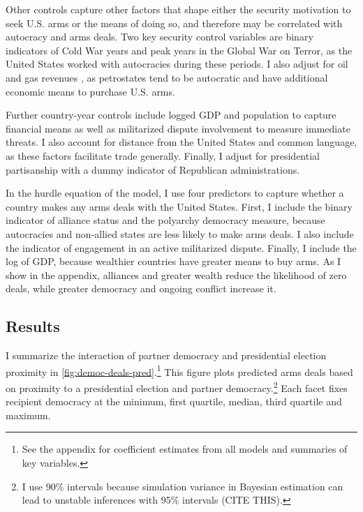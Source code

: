 \documentclass[12pt]{article}
\begin{document}
Other controls capture other factors that shape either the security motivation to seek U.S. arms or the means of doing so, and therefore may be correlated with autocracy and arms deals. 
Two key security control variables are binary indicators of Cold War years and peak years in the Global War on Terror, as the United States worked with autocracies during these periods. 
I also adjust for oil and gas revenues \citep{RossMahdavi2015}, as petrostates tend to be autocratic and have additional economic means to purchase U.S. arms.


Further country-year controls include logged GDP and population to capture financial means as well as militarized dispute involvement to measure immediate threats.
I also account for distance from the United States and common language, as these factors facilitate trade generally. 
Finally, I adjust for presidential partisanship with a dummy indicator of Republican administrations.  


In the hurdle equation of the model, I use four predictors to capture whether a country makes any arms deals with the United States. 
First, I include the binary indicator of alliance status and the polyarchy democracy measure, because autocracies and non-allied states are less likely to make arms deals. 
I also include the indicator of engagement in an active militarized dispute. 
Finally, I include the log of GDP, because wealthier countries have greater means to buy arms.
As I show in the appendix, alliances and greater wealth reduce the likelihood of zero deals, while greater democracy and ongoing conflict increase it. 


\subsection{Results}


I summarize the interaction of partner democracy and presidential election proximity in \autoref{fig:democ-deals-pred}.\footnote{See the appendix for coefficient estimates from all models and summaries of key variables.}
This figure plots predicted arms deals based on proximity to a presidential election and partner democracy.\footnote{I use 90\% intervals because simulation variance in Bayesian estimation can lead to unstable inferences with 95\% intervals (CITE THIS).}
Each facet fixes recipient democracy at the minimum, first quartile, median, third quartile and maximum.
\end{document}
